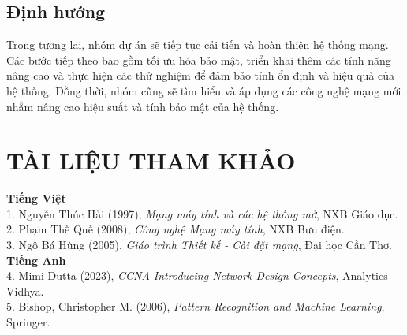 \documentclass[12pt, a4paper]{article}
\begin{document}
	\subsection{Định hướng}
	\hspace{1.5cm}Trong tương lai, nhóm dự án sẽ tiếp tục cải tiến và hoàn thiện hệ thống mạng. Các bước tiếp theo bao gồm tối ưu hóa bảo mật, triển khai thêm các tính năng nâng cao và thực hiện các thử nghiệm để đảm bảo tính ổn định và hiệu quả của hệ thống. Đồng thời, nhóm cũng sẽ tìm hiểu và áp dụng các công nghệ mạng mới nhằm nâng cao hiệu suất và tính bảo mật của hệ thống.
	
	\newpage
	\section{TÀI LIỆU THAM KHẢO}
	\setlength{\parindent}{1.5cm}
	\textbf{Tiếng Việt}\\
	\large 1. Nguyễn Thúc Hải (1997), \textit{Mạng máy tính và các hệ thống mở}, NXB Giáo dục.\\
	\large 2. Phạm Thế Quế (2008), \textit{Công nghệ Mạng máy tính}, NXB Bưu điện.\\
	\large 3. Ngô Bá Hùng (2005), \textit{Giáo trình Thiết kế - Cài đặt mạng}, Đại học Cần Thơ.\\
	\textbf{Tiếng Anh}\\
	\large 4. Mimi Dutta (2023), \textit{CCNA Introducing Network Design Concepts}, Analytics Vidhya.\\
	\large 5. Bishop, Christopher M. (2006), \textit{Pattern Recognition and Machine Learning}, Springer.
\end{document}
